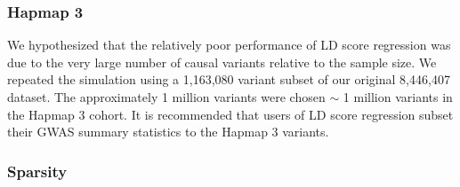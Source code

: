 \begin{table}
  \label{tab:gwas_sim_ave_error}
\caption{Comparison of methods for heritability estimation on 8M variant simulation.  Bias was calculated over all simulated values of $h^2$ $\text{Bias}(h^2,\hat{h}^2)=\frac{1}{80}\sum_{i=1}^{10}\sum_{j=1}^{8}(\hat{h^2}_{i,j}-{h^2}_j)$.   Mean squared error (MSE) was calculated similarly: $\text{Bias}(h^2,\hat{h}^2)=\frac{1}{80}\sum_{i=1}^{10}\sum_{j=1}^{8}{(\hat{h^2}_{i,j}-{h^2}_j)}^2$.}
\end{table}


\subsubsection{Hapmap 3}\label{sec:org0fa2c7f}

We hypothesized that the relatively poor performance of LD score regression was due to the very large number of causal variants relative to the sample size.  We repeated the simulation using a 1,163,080 variant subset of our original 8,446,407 dataset.  The approximately 1 million variants were chosen  $\sim$ 1 million variants in the Hapmap 3 cohort.  It is recommended that users of LD score regression subset their GWAS summary statistics to the Hapmap 3 variants.

\subsubsection{Sparsity}

